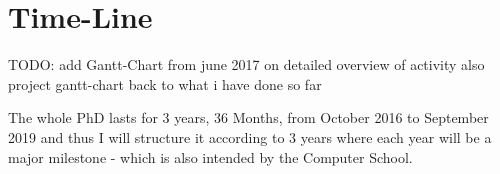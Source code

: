 \section{Time-Line}
TODO: add Gantt-Chart
from june 2017 on detailed overview of activity
also project gantt-chart back to what i have done so far

The whole PhD lasts for 3 years, 36 Months, from October 2016 to September 2019 and thus I will structure it according to 3 years where each year will be a major milestone - which is also intended by the Computer School.







